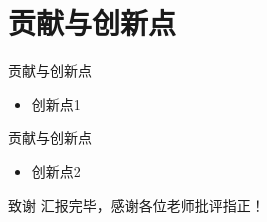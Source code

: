 \documentclass{beamer}
\begin{document}
\section{贡献与创新点}
\begin{frame}{贡献与创新点}
\begin{itemize}

    \item 创新点1

\end{itemize}
\end{frame}

\begin{frame}{贡献与创新点}
\begin{itemize}

    \item 创新点2

\end{itemize}
\end{frame}

\begin{frame}{致谢}
    \centering
    汇报完毕，感谢各位老师批评指正！
\end{frame}
\end{document}
